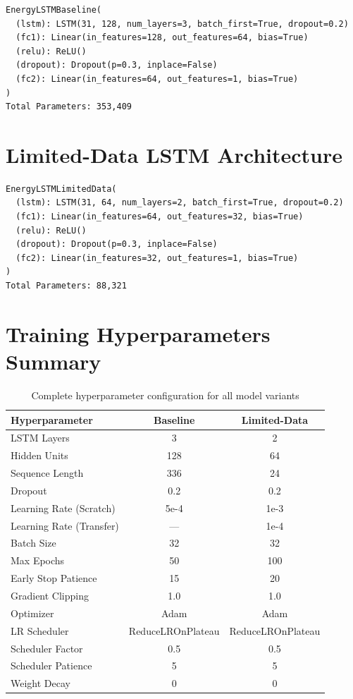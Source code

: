 \documentclass[12pt,a4paper]{report}
\begin{document}
\begin{verbatim}
EnergyLSTMBaseline(
  (lstm): LSTM(31, 128, num_layers=3, batch_first=True, dropout=0.2)
  (fc1): Linear(in_features=128, out_features=64, bias=True)
  (relu): ReLU()
  (dropout): Dropout(p=0.3, inplace=False)
  (fc2): Linear(in_features=64, out_features=1, bias=True)
)
Total Parameters: 353,409
\end{verbatim}

\section{Limited-Data LSTM Architecture}

\begin{verbatim}
EnergyLSTMLimitedData(
  (lstm): LSTM(31, 64, num_layers=2, batch_first=True, dropout=0.2)
  (fc1): Linear(in_features=64, out_features=32, bias=True)
  (relu): ReLU()
  (dropout): Dropout(p=0.3, inplace=False)
  (fc2): Linear(in_features=32, out_features=1, bias=True)
)
Total Parameters: 88,321
\end{verbatim}

\section{Training Hyperparameters Summary}

\begin{table}[H]
\centering
\caption{Complete hyperparameter configuration for all model variants}
\begin{tabular}{lcc}
\toprule
\textbf{Hyperparameter} & \textbf{Baseline} & \textbf{Limited-Data} \\
\midrule
LSTM Layers & 3 & 2 \\
Hidden Units & 128 & 64 \\
Sequence Length & 336 & 24 \\
Dropout & 0.2 & 0.2 \\
Learning Rate (Scratch) & 5e-4 & 1e-3 \\
Learning Rate (Transfer) & --- & 1e-4 \\
Batch Size & 32 & 32 \\
Max Epochs & 50 & 100 \\
Early Stop Patience & 15 & 20 \\
Gradient Clipping & 1.0 & 1.0 \\
Optimizer & Adam & Adam \\
LR Scheduler & ReduceLROnPlateau & ReduceLROnPlateau \\
Scheduler Factor & 0.5 & 0.5 \\
Scheduler Patience & 5 & 5 \\
Weight Decay & 0 & 0 \\
\bottomrule
\end{tabular}
\end{table}
\end{document}
